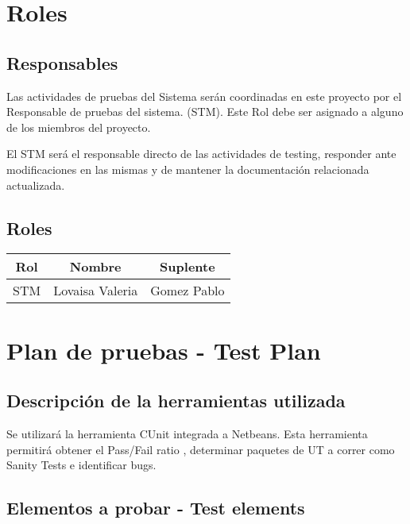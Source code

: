 \newpage
\section{\textcolor[gray]{.2}{Roles}}
\subsection{\textcolor[gray]{.2}{Responsables}}

Las actividades de pruebas del Sistema serán coordinadas en este proyecto por el Responsable de pruebas del sistema. (STM). Este Rol debe ser asignado a alguno de los miembros del proyecto.

El STM será el responsable directo de las actividades de testing, responder ante modificaciones en las mismas  y de mantener la documentación relacionada actualizada.



\subsection{\textcolor[gray]{.2}{Roles}}
\begin{table}[!h]
\begin{center}
\begin{tabular}{|c|c|c|}
\hline
\rowcolor[gray]{.8} Rol & Nombre & Suplente\\
\hline
STM & Lovaisa Valeria & Gomez Pablo\\
\hline
\end{tabular}
\end{center}
\end{table}

\newpage
\section{\textcolor[gray]{.2}{Plan de pruebas - Test Plan}}
\subsection{\textcolor[gray]{.2}{Descripción de la herramientas utilizada}}

Se utilizará la herramienta CUnit integrada a Netbeans. Esta herramienta permitirá obtener el Pass/Fail ratio , determinar paquetes de UT a correr como Sanity Tests e  identificar bugs.

\subsection{\textcolor[gray]{.2}{Elementos a probar - Test elements}}


